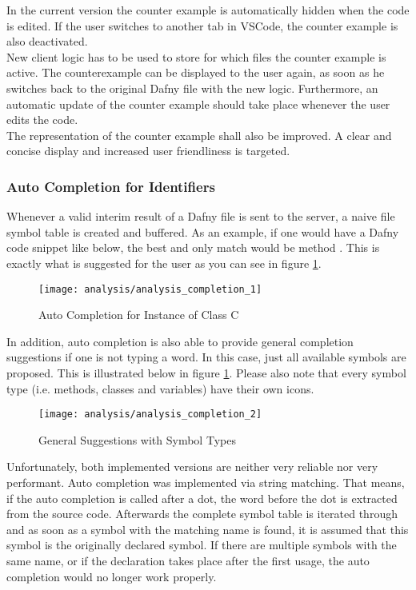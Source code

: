 In the current version the counter example is automatically hidden when the code is edited.
If the user switches to another tab in VSCode, the counter example is also deactivated. \\

New client logic has to be used to store for which files the counter example is active.
The counterexample can be displayed to the user again, as soon as he switches back to the original Dafny file with the new logic.
Furthermore, an automatic update of the counter example should take place whenever the user edits the code.\\

The representation of the counter example shall also be improved.
A clear and concise display and increased user friendliness is targeted.\\

\subsubsection{Auto Completion for Identifiers}
Whenever a valid interim result of a Dafny file is sent to the server, a naive file symbol table is created and buffered.
As an example, if one would have a Dafny code snippet like below, the best and only match would be method .
This is exactly what is suggested for the user as you can see in figure \ref{fig:analysis_completion_1}.

\begin{figure}[H]
    \centering
    \texttt{[image: analysis/analysis\_completion\_1]}
    \caption{Auto Completion for Instance of Class C}
    \label{fig:analysis_completion_1}
\end{figure}

In addition, auto completion is also able to provide general completion suggestions if one is not typing a word.
In this case, just all available symbols are proposed.
This is illustrated below in figure \ref{fig:analysis_completion_1}.
Please also note that every symbol type (i.e. methods, classes and variables) have their own icons.

\begin{figure}[H]
    \centering
    \texttt{[image: analysis/analysis\_completion\_2]}
    \caption{General Suggestions with Symbol Types}
    \label{fig:analysis_completion_2}
\end{figure}

Unfortunately, both implemented versions are neither very reliable nor very performant.
Auto completion was implemented via string matching.
That means, if the auto completion is called after a dot, the word before the dot is extracted from the source code.
Afterwards the complete symbol table is iterated through and as soon as a symbol with the matching name is found,
it is assumed that this symbol is the originally declared symbol.
If there are multiple symbols with the same name, or if the declaration takes place after the first usage,
the auto completion would no longer work properly. \\

